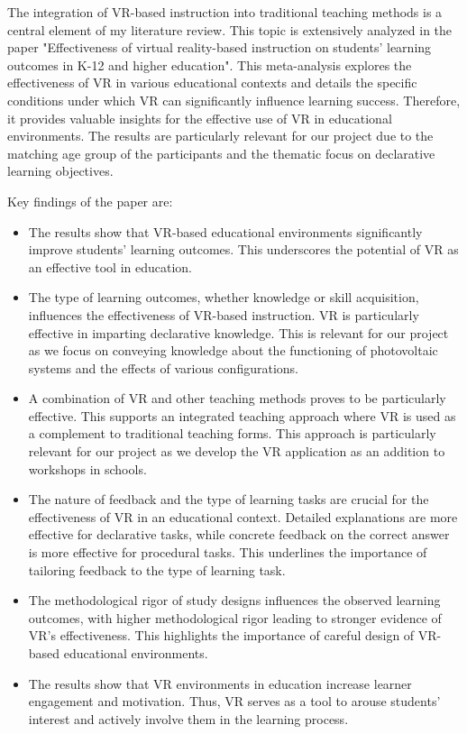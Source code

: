 \documentclass[draft, final]{vutinfth} %
\begin{document}
The integration of VR-based instruction into traditional teaching methods is a central element of my literature review. This topic is extensively analyzed in the paper "Effectiveness of virtual reality-based instruction on students' learning outcomes in K-12 and higher education"\cite{merchant2014effectiveness}. This meta-analysis explores the effectiveness of VR in various educational contexts and details the specific conditions under which VR can significantly influence learning success. Therefore, it provides valuable insights for the effective use of VR in educational environments. The results are particularly relevant for our project due to the matching age group of the participants and the thematic focus on declarative learning objectives.

Key findings of the paper are:
\begin{itemize}
  \item The results show that VR-based educational environments significantly improve students' learning outcomes. This underscores the potential of VR as an effective tool in education.

  \item The type of learning outcomes, whether knowledge or skill acquisition, influences the effectiveness of VR-based instruction. VR is particularly effective in imparting declarative knowledge. This is relevant for our project as we focus on conveying knowledge about the functioning of photovoltaic systems and the effects of various configurations.

  \item A combination of VR and other teaching methods proves to be particularly effective. This supports an integrated teaching approach where VR is used as a complement to traditional teaching forms. This approach is particularly relevant for our project as we develop the VR application as an addition to workshops in schools.

  \item The nature of feedback and the type of learning tasks are crucial for the effectiveness of VR in an educational context. Detailed explanations are more effective for declarative tasks, while concrete feedback on the correct answer is more effective for procedural tasks. This underlines the importance of tailoring feedback to the type of learning task.

  \item The methodological rigor of study designs influences the observed learning outcomes, with higher methodological rigor leading to stronger evidence of VR's effectiveness. This highlights the importance of careful design of VR-based educational environments.

  \item The results show that VR environments in education increase learner engagement and motivation. Thus, VR serves as a tool to arouse students' interest and actively involve them in the learning process.
\end{itemize}
\end{document}
